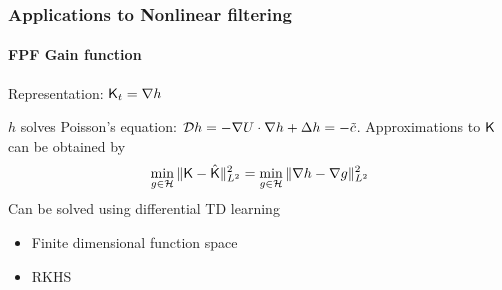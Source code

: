 \documentclass[xcolor=dvipsnames, subsection=false]{beamer}
\def\alertb#1{\alert{\color{BrickRed}  #1}}
\def\alertb#1{\alert{\color{BrickRed}  #1}}
\def\clH{{\mathcal H}}
\def\tilc{\tilde c}
\def\kFPF{\text{\sf K}}
\def\generate{{\cal D}}
\newcommand{\pot}{U}
\begin{document}
\begin{frame}
\frametitle{Applications to Nonlinear filtering}
\framesubtitle{FPF Gain function}
\centerline{\alertb{Representation:
		{\LARGE
		$
		\kFPF_t = \nabla h
		$}}
}
\vfill
$h$ solves \alertb{Poisson's equation:}  $ \generate h = -\nabla \pot \cdot \nabla h + \Delta h = - \tilc$.
Approximations to $\kFPF$ can be obtained by
\[
\min_{g \in \clH} \| \kFPF - \hat{\kFPF}\|^2_{L^2} = \min_{g \in \clH} \| \nabla h - \nabla g \|^2_{L^2}
\]
Can be solved using differential TD learning
\begin{itemize}
\item Finite dimensional function space
\item RKHS
\end{itemize}
\end{frame}
\end{document}
